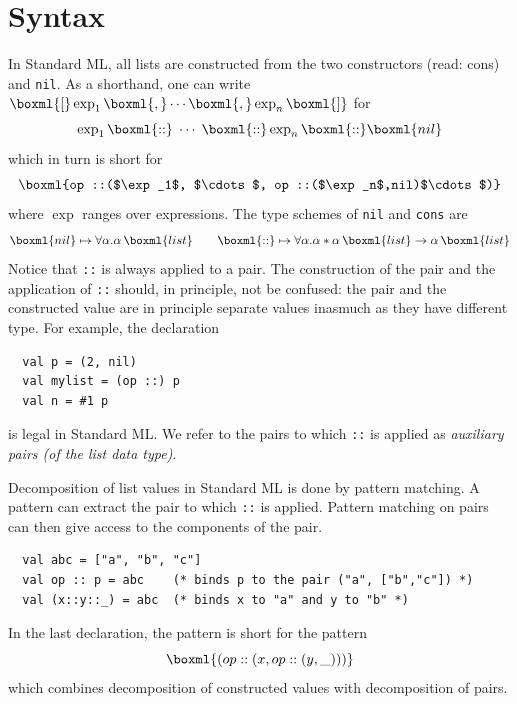 \documentclass[12pt]{book}
\begin{document}
\section{Syntax}
\label{lsyn.sec}
In Standard ML, all lists are constructed
from the two constructors
%
\boxml{::} (read: cons) and
%
{\tt nil}.  As a shorthand, one can write
$\boxml{[}\exp_1\boxml{,}\cdots \boxml{,}\exp_n\boxml{]}$ for
$$ \exp_1\boxml{::}\; \cdots\; \boxml{::} \exp_n\boxml{::}\boxml{nil}$$
which in turn is short for
$$
\boxml{op ::($\exp_1$, $\cdots$, op ::($\exp_n$,nil)$\cdots$)}$$
where $\exp$ ranges over expressions.  The type schemes of {\tt nil}
and {\tt cons} are
$$\boxml{nil}\mapsto\forall\alpha.\alpha\,\boxml{list}\qquad
\boxml{::} \mapsto\forall\alpha.\alpha\ast\alpha\,\boxml{list}\to\alpha\,\boxml{list}
$$
Notice that {\tt ::} is always applied to a pair. The construction
of the pair and the application of {\tt ::} should, in principle, not
be confused: the pair and the constructed value are in principle
separate values inasmuch as they have different type.  For example,
the declaration
\begin{verbatim}
  val p = (2, nil)
  val mylist = (op ::) p
  val n = #1 p
\end{verbatim}
is legal in Standard ML. We refer to the pairs to which {\tt ::} is
applied as
%
{\em auxiliary pairs (of the list data type)}.

Decomposition of list values in Standard ML is done by
%
pattern matching.  A pattern can extract the pair to which {\tt ::} is
applied. Pattern matching on pairs can then give access to the
components of the pair.
\begin{verbatim}
  val abc = ["a", "b", "c"]
  val op :: p = abc    (* binds p to the pair ("a", ["b","c"]) *)
  val (x::y::_) = abc  (* binds x to "a" and y to "b" *)
\end{verbatim}
In the last declaration, the pattern  is short for
the pattern
$$\boxml{(op ::(x, op ::(y, \_)))}$$
which combines decomposition of
constructed values with decomposition of pairs.
\end{document}
